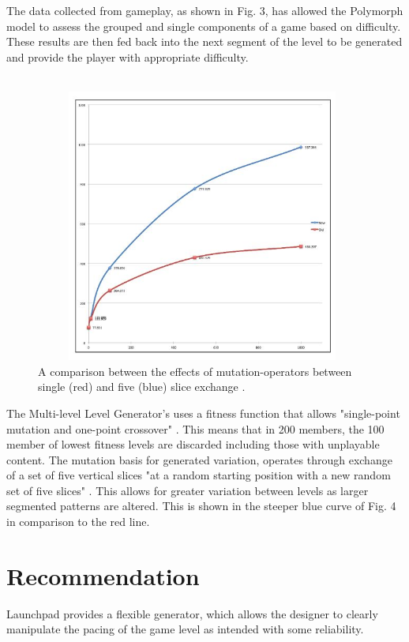 \documentclass{scrartcl}
\begin{document}
The data collected from gameplay, as shown in Fig. 3, has allowed the Polymorph model to assess the grouped and single components of a game based on difficulty. These results are then fed back into the next segment of the level to be generated and provide the player with appropriate difficulty. \\ \\
\begin{figure}[h]
\includegraphics[width=11cm, height=9cm]{Dah_Fig1}
\centering
\caption{A comparison between the effects of mutation-operators between single (red) and five (blue) slice exchange \cite[pp. 4]{Dahlskog2014}.}
\end{figure}
The Multi-level Level Generator's uses a fitness function that allows "single-point mutation and one-point crossover" \cite[pp. 4]{Dahlskog2014}. This means that in 200 members, the 100 member of lowest fitness levels are discarded including those with unplayable content. The mutation basis for generated variation, operates through exchange of a set of five vertical slices "at a random starting position with a new random set of five slices" \cite[pp. 4]{Dahlskog2014}. This allows for greater variation between levels as larger segmented patterns are altered. This is shown in the steeper blue curve of Fig. 4 in comparison to the red line.

\section{Recommendation}

Launchpad provides a flexible generator, which allows the designer to clearly manipulate the pacing of the game level as intended with some reliability. 
\end{document}
